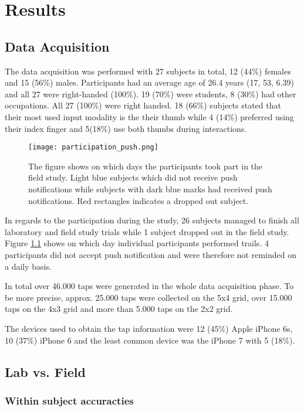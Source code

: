 \chapter{Results\label{cha:chapter6}}
\section{Data Acquisition}
The data acquisition was performed with 27 subjects in total, 12 (44\%) females and 15 (56\%) males. Participants had an average age of 26.4 years (17, 53, 6.39) and all 27 were right-handed (100\%). 19 (70\%) were students, 8 (30\%) had other occupations. All 27 (100\%) were right handed.
18 (66\%) subjects stated that their most used input modality is the their thumb while 4 (14\%) preferred using their index finger and 5(18\%) use both thumbs during interactions.\\

\begin{figure}[h!]
  \centering
  \texttt{[image: participation\_push.png]}
  \caption{The figure shows on which days the participants took part in the field study. Light blue subjects which did not receive push notifications while subjects with dark blue marks had received push notifications. Red rectangles indicates a dropped out subject.} \label{fig:participation}
\end{figure}

In regards to the participation during the study, 26 subjects managed to finish all laboratory and field study trials while 1 subject dropped out in the field study. Figure \ref{fig:participation} shows on which day individual participants performed trails. 4 participants did not accept push notification and were therefore not reminded on a daily basis.

In total over 46.000 taps were generated in the whole data acquisition phase. To be more precise, approx. 25.000 taps were collected on the 5x4 grid, over 15.000 taps on the 4x3 grid and more than 5.000 taps on the 2x2 grid.

The devices used to obtain the tap information were 12 (45\%) Apple iPhone 6s, 10 (37\%) iPhone 6 and the least common device was the iPhone 7 with 5 (18\%).

\section{Lab vs. Field}
\subsection{Within subject accuracties}
